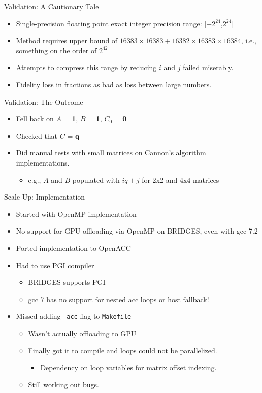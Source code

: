 \documentclass{beamer}
\begin{document}
\begin{frame}{Validation: A Cautionary Tale}
  \begin{itemize}
  \item{Single-precision floating point exact integer precision range: [$-2^{24}$,$2^{24}$]\autocite{SPIntLimit}}
  \item{Method requires upper bound of $16383 \times 16383 + 16382 \times 16383 \times 16384$, i.e., something on the order of $2^{42}$}
  \item{Attempts to compress this range by reducing $i$ and $j$ failed miserably.}
  \item{Fidelity loss in fractions as bad as loss between large numbers.}
  \end{itemize}
\end{frame}
\begin{frame}{Validation: The Outcome}
  \begin{itemize}
  \item{Fell back on $A$ = \textbf{1}, $B$ = \textbf{1}, $C_{0}$ = \textbf{0}}
  \item{Checked that $C$ = \textbf{q}}
  \item{Did manual tests with small matrices on Cannon's algorithm implementations.}
    \begin{itemize}
    \item{e.g., $A$ and $B$ populated with $iq + j$ for 2x2 and 4x4 matrices}
    \end{itemize}
  \end{itemize}
\end{frame}
\begin{frame}{Scale-Up: Implementation}
  \begin{itemize}
  \item{Started with OpenMP implementation}
  \item{No support for GPU offloading via OpenMP on BRIDGES, even with gcc-7.2}
  \item{Ported implementation to OpenACC}
  \item{Had to use PGI compiler}
    \begin{itemize}
    \item{BRIDGES supports PGI\autocite{BridgesGPUGuide}}
    \item{gcc 7 has no support for nested acc loops or host fallback!\autocite{gccOpenACC}}
    \end{itemize}
  \item{Missed adding \texttt{-acc} flag to \texttt{Makefile}}
    \begin{itemize}
    \item{Wasn't actually offloading to GPU}
    \item{Finally got it to compile and loops could not be parallelized.}
      \begin{itemize}
      \item{Dependency on loop variables for matrix offset indexing.}
      \end{itemize}
    \item{Still working out bugs.}
    \end{itemize}
\end{itemize}
\end{frame}
\end{document}
